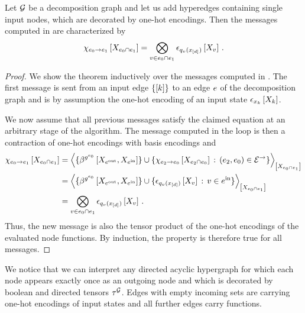 \begin{theorem}
    \label{the:directedBeliefPropagationExactness}
    Let $\mathcal{G}$ be a decomposition graph and let us add hyperedges containing single input nodes, which are decorated by one-hot encodings.
    Then the messages computed in  are characterized by
    \begin{align*}
        \chi_{e_{0} \rightarrow e_{1}}\left[X_{e_{0} \cap e_{1}}\right]
        = \bigotimes_{v\in e_{0}\cap e_{1}} \epsilon_{q_{v}(x_{[d]})}\left[X_{v}\right] \, .
    \end{align*}
\end{theorem}
\begin{proof}
    We show the theorem inductively over the messages computed in .
    The first message is sent from an input edge $\{[k]\}$ to an edge $e$ of the decomposition graph and is by assumption the one-hot encoding of an input state $\epsilon_{x_{k}}\left[X_{k}\right]$.

    We now assume that all previous messages satisfy the claimed equation at an arbitrary stage of the algorithm.
    The message computed in the \whileSymbol{} loop is then a contraction of one-hot encodings with basis encodings and
    \begin{align*}
        \mesfromtowith{\sedge}{\redge}
        &=\contractionof{\{\bencodingofat{\secexfunctionof{\sedge}}{\catvariableof{\outgoingnodes},\catvariableof{\incomingnodes}}\} \cup
            \{\mesfromtowith{\secsedge}{\sedge} \wcols (\secsedge,\sedge)\in\dirovedges\}
        }{\catvariableof{\sedge\cap\redge}} \\
        &=\contractionof{\{\bencodingofat{\secexfunctionof{\sedge}}{\catvariableof{\outgoingnodes},\catvariableof{\incomingnodes}}\} \cup
            \{\onehotmapofat{\exfunctionof{\node}(\shortcatindices)}{\catvariableof{\node}} \wcols \node\in\incomingnodes\}
        }{\catvariableof{\sedge\cap\redge}} \\
        &= \bigotimes_{\node\in\sedge\cap\redge} \onehotmapofat{\exfunctionof{\node}(\shortcatindices)}{\catvariableof{\node}} \, .
    \end{align*}
    Thus, the new message is also the tensor product of the one-hot encodings of the evaluated node functions.
    By induction, the property is therefore true for all messages.
\end{proof}

We notice that we can interpret any directed acyclic hypergraph for which each node appears exactly once as an outgoing node and which is decorated by boolean and directed tensors $\tau^{\mathcal{G}}$.
Edges with empty incoming sets are carrying one-hot encodings of input states and all further edges carry functions.

